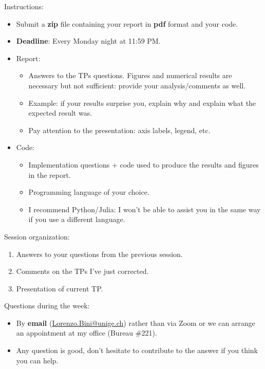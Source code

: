 \documentclass[handout]{beamer}
\begin{document}
\begin{frame}
    Instructions: \pause
    \begin{itemize}
    \item Submit a \textbf{zip} file containing your report in \textbf{pdf} format and your code. \pause
    \item \textbf{Deadline}: Every Monday night at 11:59 PM. \pause
    \item Report: \pause
    \begin{itemize}
    \item Answers to the TPs questions. Figures and numerical results are necessary but not sufficient: provide your analysis/comments as well. \pause
    \item Example: if your results surprise you, explain why and explain what the expected result was. \pause
    \item Pay attention to the presentation: axis labels, legend, etc. \pause
    \end{itemize}
    \item Code: \pause
    \begin{itemize}
        \item Implementation questions + code used to produce the results and figures in the report. \pause
        \item Programming language of your choice. \pause
        \item I recommend Python/Julia: I won't be able to assist you in the same way if you use a different language.
    \end{itemize}
\end{itemize}
\end{frame}

\begin{frame}
Session organization: \pause
\vspace{1cm}
\begin{enumerate}
\item Answers to your questions from the previous session. \pause
\item Comments on the TPs I've just corrected. \pause
\item Presentation of current TP.
\end{enumerate}
\end{frame}

\begin{frame}
Questions during the week: \pause
\vspace{1cm}
\begin{itemize}
\item By \textbf{email} (\href{mailto:Lorenzo.Bini@unige.ch}{Lorenzo.Bini@unige.ch}) rather than via Zoom or we can arrange an appointment at my office (Bureau \#221). \pause
\item Any question is good, don't hesitate to contribute to the answer if you think you can help.
\end{itemize}
\end{frame}
\end{document}
